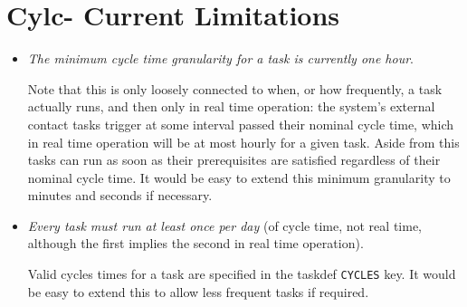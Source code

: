 \documentclass[11pt,a4paper]{article}
\begin{document}
\section{Cylc- Current Limitations}

\begin{itemize}

        \item {\em The minimum cycle time granularity for a task is currently one hour}.

Note that this is only loosely connected to when, or how frequently, a
task actually runs, and then only in real time operation: the system's
external contact tasks trigger at some interval passed their nominal
cycle time, which in real time operation will be at most hourly for a
given task. Aside from this tasks can run as soon as their prerequisites
are satisfied regardless of their nominal cycle time. It would be easy
to extend this minimum granularity to minutes and seconds if necessary.  

    \item {\em Every task must run at least once per day} (of cycle
        time, not real time, although the first implies the second in
        real time operation). 

Valid cycles times for a task are specified in the taskdef
\lstinline=CYCLES= key.  It would be easy to extend this to allow less
frequent tasks if required. 

\end{itemize}

%

%
\end{document}
